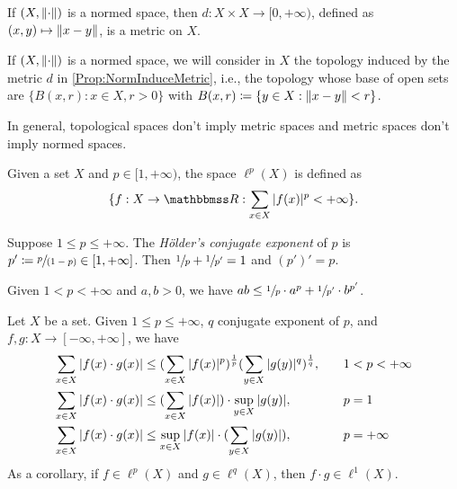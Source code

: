 \documentclass[screen,single]{techreport}
\numberwithin{equation}{section}
\begin{document}
\begin{proposition}\label{Prop:NormInduceMetric}
	If $(X,\|{\cdot}\|)$ is a normed space, then $d : X \times X \to [0,+\infty)$, defined as $(x,y) \mapsto \|{x-y}\|$, is a metric on $X$.
\end{proposition}

\begin{remark}\label{Rem:NormedBalls}
	If $(X,\|{\cdot}\|)$ is a normed space, we will consider in $X$ the topology induced by the metric $d$ in \cref{Prop:NormInduceMetric}, i.e., the topology whose base of open sets are $\{ B(x,r) : x \in X, r > 0 \}$ with $B(x,r) \coloneqq \{ y \in X : \|{x-y}\| < r \}$.
\end{remark}

\begin{remark}\label{Rem:MetricNotImplyNorm}
	In general, topological spaces don't imply metric spaces and metric spaces don't imply normed spaces.
\end{remark}

\begin{definition}\label{De:lpSpaces}
	Given a set $X$ and $p \in [1,+\infty)$, the space $\ell^p(X)$ is defined as
	\begin{equation*}
		\set{ f : X \to \bbR : \sum_{x \in X} \abs{f(x)}^p < +\infty }.
	\end{equation*}
\end{definition}

\begin{definition}\label{De:HoldersConjugateExponent}
	Suppose $1 \le p \le +\infty$.
	The \emph{H{\"o}lder's conjugate exponent} of $p$ is $p' \coloneqq \sfrac{p}{(1-p)} \in [1,+\infty]$.
	Then $\sfrac{1}{p} + \sfrac{1}{p'}=1$ and $(p')' = p$.
\end{definition}

\begin{theorem}\label{The:YangsInequality}
	Given $1 < p < +\infty$ and $a,b > 0$, we have $ab \le \sfrac{1}{p}  \cdot a^p + \sfrac{1}{p'} \cdot b^{p'}$.
\end{theorem}

\begin{theorem}\label{The:HoldersInequality}
	Let $X$ be a set.
	Given $1 \le p \le +\infty$, $q$ conjugate exponent of $p$, and $f,g: X \to [-\infty,+\infty]$, we have
	\begin{alignat*}{2}
		\sum_{x \in X} |{f(x) \cdot g(x)}| & \le  ({ \sum_{x \in X} |{f(x)}|^p })^{\frac{1}{p}} ({  \sum_{y \in X} |{g(y)}|^q })^{\frac{1}{q}}, \quad &&  1 < p < +\infty \\
		\sum_{x \in X} |{f(x) \cdot g(x)}| & \le ({ \sum_{x \in X} |{f(x)}| }) \cdot \sup_{y \in X} |{g(y)}|, \quad &&  p=1 \\
		\sum_{x \in X} |{f(x) \cdot g(x)}| & \le \sup_{x \in X} |{f(x)}| \cdot ({ \sum_{y \in X} |{g(y)}| }), \quad && p=+\infty
	\end{alignat*}
	As a corollary, if $f \in \ell^p(X)$ and $g \in \ell^q(X)$, then $f \cdot g \in \ell^1(X)$.
\end{theorem}
\end{document}
